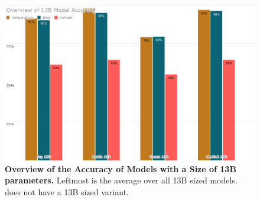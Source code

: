 \begin{figure}[!htbp]
    \begin{centering}
        \includegraphics[width=\textwidth]{img/overview_13b_accuracy}
        \caption[Overview of 13B Models Accuracy]{\textbf{Overview of the Accuracy of Models with a Size of 13B parameters.}
        Leftmost is the average over all 13B sized models.
         does not have a 13B sized variant.
        }
        \label{fig:13b_acc}
    \end{centering}
\end{figure}

